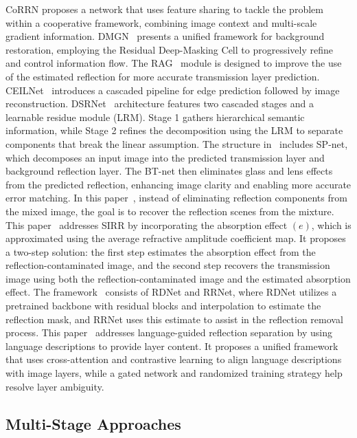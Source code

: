 CoRRN\cite{wan2019corrn} proposes a network that uses feature sharing to tackle the problem within a cooperative framework, combining image context and multi-scale gradient information. 
DMGN~\cite{feng2021deep} presents a unified framework for background restoration, employing the Residual Deep-Masking Cell to progressively refine and control information flow. 
The RAG~\cite{li2023two} module is designed to improve the use of the estimated reflection for more accurate transmission layer prediction. 
CEILNet~\cite{fan2017generic} introduces a cascaded pipeline for edge prediction followed by image reconstruction.
DSRNet~\cite{hu2023single} architecture features two cascaded stages and a learnable residue module (LRM). Stage 1 gathers hierarchical semantic information, while Stage 2 refines the decomposition using the LRM to separate components that break the linear assumption.
The structure in~\cite{kim2020single} includes SP-net, which decomposes an input image into the predicted transmission layer and background reflection layer. The BT-net then eliminates glass and lens effects from the predicted reflection, enhancing image clarity and enabling more accurate error matching.
In this paper~\cite{wan2020reflection}, instead of eliminating reflection components from the mixed image, the goal is to recover the reflection scenes from the mixture.
This paper~\cite{zheng2021single} addresses SIRR by incorporating the absorption effect $(e)$, which is approximated using the average refractive amplitude coefficient map. It proposes a two-step solution: the first step estimates the absorption effect from the reflection-contaminated image, and the second step recovers the transmission image using both the reflection-contaminated image and the estimated absorption effect.
The framework~\cite{zhu2024revisiting} consists of RDNet and RRNet, where RDNet utilizes a pretrained backbone with residual blocks and interpolation to estimate the reflection mask, and RRNet uses this estimate to assist in the reflection removal process.
This paper~\cite{zhong2024language} addresses language-guided reflection separation by using language descriptions to provide layer content. It proposes a unified framework that uses cross-attention and contrastive learning to align language descriptions with image layers, while a gated network and randomized training strategy help resolve layer ambiguity.



\subsection{Multi-Stage Approaches}
\label{sec:multi-stage}

